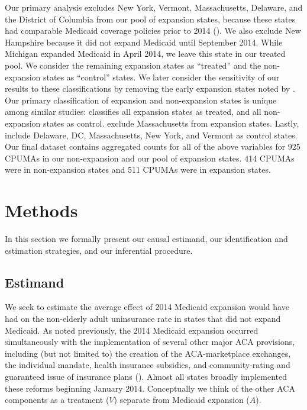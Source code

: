 \documentclass[12pt]{article}
\begin{document}
Our primary analysis excludes New York, Vermont, Massachusetts, Delaware, and the District of Columbia from our pool of expansion states, because these states had comparable Medicaid coverage policies prior to 2014 (\cite{kaestner2017effects}). We also exclude New Hampshire because it did not expand Medicaid until September 2014. While Michigan expanded Medicaid in April 2014, we leave this state in our treated pool. We consider the remaining expansion states as ``treated'' and the non-expansion states as ``control'' states. We later consider the sensitivity of our results to these classifications by removing the early expansion states noted by \cite{frean2017premium}. Our primary classification of expansion and non-expansion states is unique among similar studies: \cite{courtemanche2017early} classifies all expansion states as treated, and all non-expansion states as control. \cite{frean2017premium} exclude Massachusetts from expansion states. Lastly, \cite{kaestner2017effects} include Delaware, DC, Massachusetts, New York, and Vermont as control states. Our final dataset contains aggregated counts for all of the above variables for 925 CPUMAs in our non-expansion and our pool of expansion states. 414 CPUMAs were in non-expansion states and 511 CPUMAs were in expansion states.

\section{Methods}
\label{sec:methods}

In this section we formally present our causal estimand, our identification and estimation strategies, and our inferential procedure.

\subsection{Estimand}

We seek to estimate the average effect of 2014 Medicaid expansion would have had on the non-elderly adult uninsurance rate in states that did not expand Medicaid. As noted previously, the 2014 Medicaid expansion occurred simultaneously with the implementation of several other major ACA provisions, including (but not limited to) the creation of the ACA-marketplace exchanges, the individual mandate, health insurance subsidies, and community-rating and guaranteed issue of insurance plans (\cite{courtemanche2017early}). Almost all states broadly implemented these reforms beginning January 2014. Conceptually we think of the other ACA components as a treatment ($V$) separate from Medicaid expansion ($A$).
\end{document}
